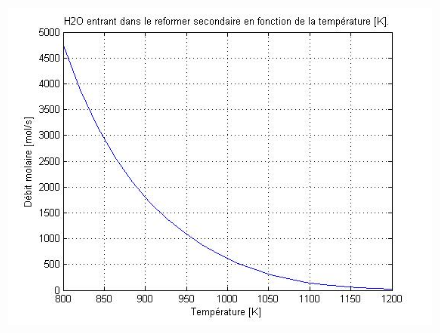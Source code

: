 \begin{figure}[htb!]
	\centering
	\includegraphics[scale=0.70]{media/etude_param/useful/h2o_in2_reformage_secondaire.jpg}
\end{figure}

\begin{figure}[htb!]
	\centering
\end{figure}

